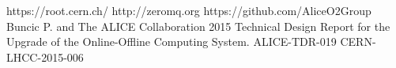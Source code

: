 \begin{thebibliography}{9}
   https://root.cern.ch/
   http://zeromq.org
   https://github.com/AliceO2Group
   Buncic P. and The ALICE Collaboration 2015 Technical Design Report for the Upgrade of the Online-Offline Computing System. ALICE-TDR-019 CERN-LHCC-2015-006
\end{thebibliography}

